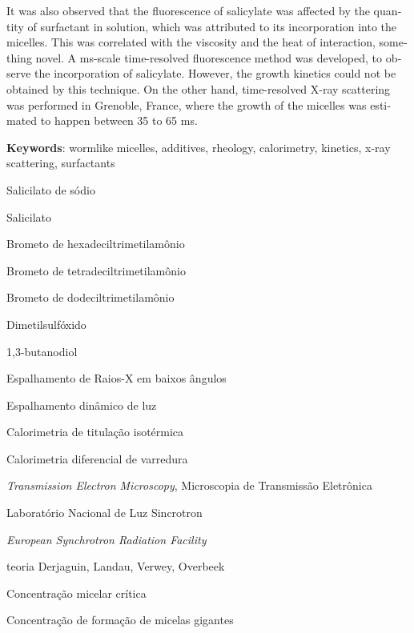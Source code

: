 \documentclass[
	12pt,				%
	openright,			%
	twoside,			%
	a4paper,			%
	english,			%
	brazil%
	]{abntex2}
\newcommand{\Sal}{Sal\textsuperscript{--}}
\newcommand{\cmc}{CMC}
\newcommand{\cwlm}{\(\mathrm{C}_{\mathrm{WLM}}\)}
\newcommand{\CTAB}{C\textsubscript{16}TAB}
\newcommand{\TTAB}{C\textsubscript{14}TAB}
\newcommand{\DTAB}{C\textsubscript{12}TAB}
\newcommand{\BD}{1,3-BD}
\begin{document}
\begin{resumo}[Abstract]
\begin{english}
 	It was also observed that the fluorescence of salicylate was affected by the quantity of surfactant in solution, which was attributed to its incorporation into the micelles. This was correlated with the viscosity and the heat of interaction, something novel. A ms-scale time-resolved fluorescence method was developed, to observe the incorporation of salicylate. However, the growth kinetics could not be obtained by this technique. On the other hand, time-resolved X-ray scattering was performed in Grenoble, France, where the growth of the micelles was estimated to happen between 35 to 65 ms.
 	
   \vspace{\onelineskip}
 
   \noindent 
   \textbf{Keywords}: wormlike micelles, additives, rheology, calorimetry, kinetics, x-ray scattering, surfactants
 \end{english}
\end{resumo}




\listoffigures*
\cleardoublepage

\listoftables*
\listoflistings
\cleardoublepage

\begin{siglas}
  \item[NaSal] Salicilato de sódio
  \item[\Sal] Salicilato
  \item[\CTAB] Brometo de hexadeciltrimetilamônio
  \item[\TTAB] Brometo de tetradeciltrimetilamônio
  \item[\DTAB] Brometo de dodeciltrimetilamônio
  \item[DMSO] Dimetilsulfóxido
  \item[\BD] 1,3-butanodiol
  \item[SAXS] Espalhamento de Raios-X em baixos ângulos
  \item[DLS] Espalhamento dinâmico de luz
  \item[ITC] Calorimetria de titulação isotérmica
  \item[DSC] Calorimetria diferencial de varredura
  \item[TEM] \emph{Transmission Electron Microscopy}, Microscopia de Transmissão Eletrônica
  \item[LNLS] Laboratório Nacional de Luz Sincrotron
  \item[ESRF] \emph{European Synchrotron Radiation Facility}
  \item[DLVO] teoria Derjaguin, Landau, Verwey, Overbeek
  \item[\cmc] Concentração micelar crítica
  \item[\cwlm] Concentração de formação de micelas gigantes
  
\end{siglas}
\end{document}

